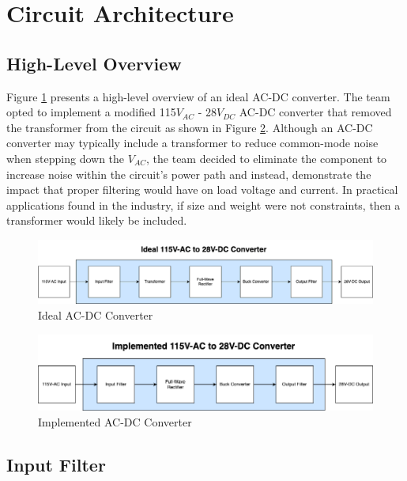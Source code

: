 \documentclass[conference]{IEEEtran}
\begin{document}
\section{Circuit Architecture}

\subsection{High-Level Overview}

Figure \ref{fig:ac_dc_converter_ideal_diagram} presents a high-level overview of an ideal AC-DC converter. The team opted to implement a modified 115$V_{AC}$ - 28$V_{DC}$ AC-DC converter that removed the transformer from the circuit as shown in Figure \ref{fig:ac_dc_converter_implemented_diagram}. Although an AC-DC converter may typically include a transformer to reduce common-mode noise when stepping down the $V_{AC}$, the team decided to eliminate the component to increase noise within the circuit's power path and instead, demonstrate the impact that proper filtering would have on load voltage and current. In practical applications found in the industry, if size and weight were not constraints, then a transformer would likely be included.

\begin{figure}[htbp]
    \centering
    \includegraphics[width=1.0\linewidth]{ac_dc_converter_ideal.png}
    \caption{Ideal AC-DC Converter}
    \label{fig:ac_dc_converter_ideal_diagram}
\end{figure}

\begin{figure}[h]
    \centering
    \includegraphics[width=1.0\linewidth]{ac_dc_converter_implemented.png}
    \caption{Implemented AC-DC Converter}
    \label{fig:ac_dc_converter_implemented_diagram}
\end{figure}

\subsection{Input Filter}
\end{document}
